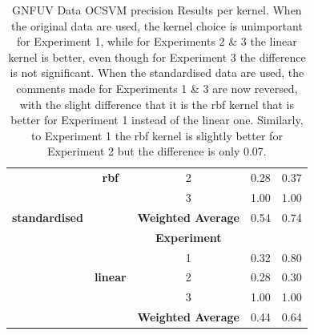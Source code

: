 \documentclass{mpaper}
\begin{document}
\begin{table}[]
\begin{tabular}{|c|c|ccc|}
                            & \textbf{rbf}    & \multicolumn{1}{c|}{2}                         & 0.28             & 0.37              \\
                            &                 & \multicolumn{1}{c|}{3}                         & 1.00             & 1.00              \\ \cline{3-5} 
\textbf{standardised}       &                 & \multicolumn{1}{c|}{\textbf{Weighted Average}} & 0.54             & 0.74              \\ \cline{2-5} 
                            &                 & \multicolumn{1}{c|}{\textbf{Experiment}}       & \textbf{}        & \textbf{}         \\ \cline{3-5} 
                            &                 & \multicolumn{1}{c|}{1}                         & 0.32             & 0.80              \\
\multicolumn{1}{|l|}{}      & \textbf{linear} & \multicolumn{1}{c|}{2}                         & 0.28             & 0.30              \\
                            &                 & \multicolumn{1}{c|}{3}                         & 1.00             & 1.00              \\ \cline{3-5} 
                            &                 & \multicolumn{1}{c|}{\textbf{Weighted Average}} & 0.44             & 0.64              \\ \hline
\end{tabular}
\caption{\label{tab:gnfuv_ocsvm_precision_per_kernel} GNFUV Data OCSVM precision Results per kernel. When the original data are used, the kernel choice is unimportant for Experiment 1, while for Experiments 2 \& 3 the linear kernel is better, even though for Experiment 3 the difference is not significant. When the standardised data are used, the comments made for Experiments 1 \& 3 are now reversed, with the slight difference that it is the rbf kernel that is better for Experiment 1 instead of the linear one. Similarly, to Experiment 1 the rbf kernel is slightly better for Experiment 2 but the difference is only 0.07.}
\end{table}
\end{document}
